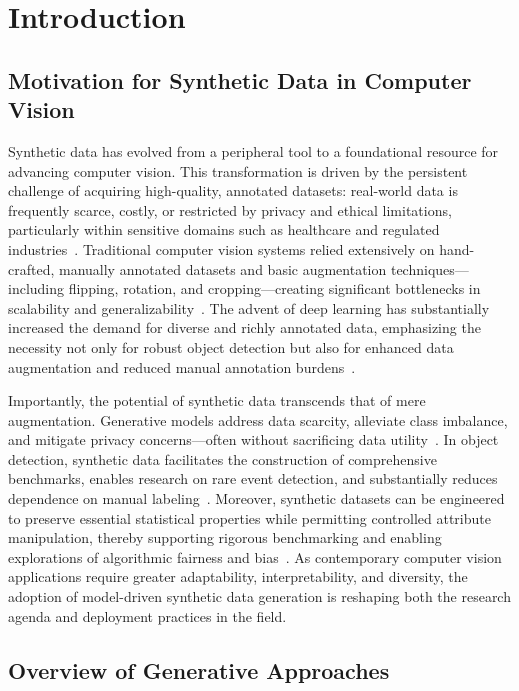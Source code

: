 \section{Introduction}

\subsection{Motivation for Synthetic Data in Computer Vision}

Synthetic data has evolved from a peripheral tool to a foundational resource for advancing computer vision. This transformation is driven by the persistent challenge of acquiring high-quality, annotated datasets: real-world data is frequently scarce, costly, or restricted by privacy and ethical limitations, particularly within sensitive domains such as healthcare and regulated industries~\cite{ref12,ref21,ref22,ref33,ref35,ref43,ref87}. Traditional computer vision systems relied extensively on hand-crafted, manually annotated datasets and basic augmentation techniques—including flipping, rotation, and cropping—creating significant bottlenecks in scalability and generalizability~\cite{ref49,ref61,ref62,ref65}. The advent of deep learning has substantially increased the demand for diverse and richly annotated data, emphasizing the necessity not only for robust object detection but also for enhanced data augmentation and reduced manual annotation burdens~\cite{ref35,ref43,ref49,ref61,ref62,ref64,ref65}.

Importantly, the potential of synthetic data transcends that of mere augmentation. Generative models address data scarcity, alleviate class imbalance, and mitigate privacy concerns—often without sacrificing data utility~\cite{ref33,ref35,ref43}. In object detection, synthetic data facilitates the construction of comprehensive benchmarks, enables research on rare event detection, and substantially reduces dependence on manual labeling~\cite{ref49,ref61}. Moreover, synthetic datasets can be engineered to preserve essential statistical properties while permitting controlled attribute manipulation, thereby supporting rigorous benchmarking and enabling explorations of algorithmic fairness and bias~\cite{ref12,ref14}. As contemporary computer vision applications require greater adaptability, interpretability, and diversity, the adoption of model-driven synthetic data generation is reshaping both the research agenda and deployment practices in the field.

\subsection{Overview of Generative Approaches}

